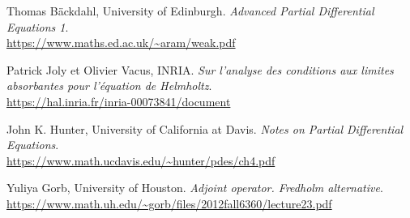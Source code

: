 \begin{thebibliography}{9}
    Thomas Bäckdahl, University of Edinburgh.
    \textit{Advanced Partial Differential Equations 1}. \\
    \url{https://www.maths.ed.ac.uk/~aram/weak.pdf}

    Patrick Joly et Olivier Vacus, INRIA.
    \textit{Sur l'analyse des conditions aux limites absorbantes pour
    l'équation de Helmholtz}. \\
    \url{https://hal.inria.fr/inria-00073841/document}

    John K. Hunter, University of California at Davis.
    \textit{Notes on Partial Differential Equations}. \\
    \url{https://www.math.ucdavis.edu/~hunter/pdes/ch4.pdf}

    Yuliya Gorb, University of Houston.
    \textit{Adjoint operator. Fredholm alternative}. \\
    \url{https://www.math.uh.edu/~gorb/files/2012fall6360/lecture23.pdf}

\end{thebibliography}
